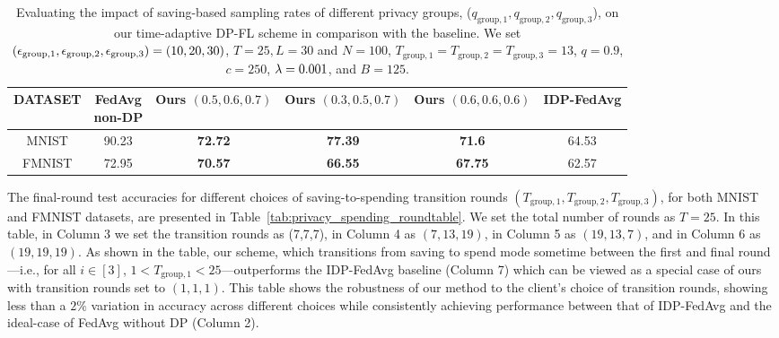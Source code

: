 {\begin{table}[h!]
\centering
\caption{
{Evaluating the impact of saving-based sampling rates of different privacy groups, ($q_{\text{group},1},q_{\text{group},2},q_{\text{group},3}$), on our time-adaptive DP-FL scheme in comparison with the baseline. We set $({\epsilon}_{\text{group},1},{\epsilon}_{\text{group},2},{\epsilon}_{\text{group},3}) = (10,20,30)$, $T=25, L=30$ and $N=100$, $T_{\text{group},1}=T_{\text{group},2}=T_{\text{group},3}=13$, $q=0.9$, $c=250$, $\lambda=0.001$, and $B=125$.}}
\small 
\setlength{\tabcolsep}{10pt} 
\renewcommand{\arraystretch}{1.2}  
\begin{tabular}{cccccc}
\toprule
{ \textbf{DATASET}}  &  \makecell[t]{{\scriptsize\textbf{FedAvg}} \\ {\scriptsize non-DP}} &\makecell[t]{{\scriptsize\textbf{Ours}} \\ {\scriptsize $(0.5,0.6,0.7)$}} & \makecell[t]{{\scriptsize\textbf{Ours}} \\ {\scriptsize $(0.3,0.5,0.7)$}} & \makecell[t]{{\scriptsize\textbf{Ours}} \\ {\scriptsize $(0.6,0.6,0.6)$}}  & {\scriptsize \textbf{IDP-FedAvg}}\\ 
\midrule
MNIST & 90.23 & \textbf{72.72} & \textbf{77.39} & \textbf{71.6} & 64.53 \\  
\midrule
FMNIST & 72.95 & \textbf{70.57}  & \textbf{66.55}  & \textbf{67.75} & 62.57   \\  
\midrule
\end{tabular}
\label{tab:saving_sampling_ratestable}
\end{table}

{The final-round test accuracies for different choices of saving-to-spending transition rounds $(T_{\text{group},1},T_{\text{group},2},T_{\text{group},3})$, for both MNIST and FMNIST datasets, are presented in Table~\ref{tab:privacy_spending_roundtable}. We set the total number of rounds as $T=25$. In this table, in Column 3 we set the transition rounds as (7,7,7), in Column 4 as $(7,13,19)$, in Column 5 as $(19,13,7)$, and in Column 6 as $(19,19,19)$. As shown in the table, our scheme, which transitions from saving to spend mode sometime between the first and final round---i.e., for all $i\in [3]$, $1<T_{\text{group},1}<25$---outperforms the IDP-FedAvg baseline (Column 7) which can be viewed as a special case of ours with transition rounds set to $(1,1,1)$. This table shows the robustness of our method to the client's choice of transition rounds, showing less than a $2\%$ variation in accuracy across different choices  while consistently achieving performance between that of IDP-FedAvg and the ideal-case of FedAvg without DP (Column 2).}


}
